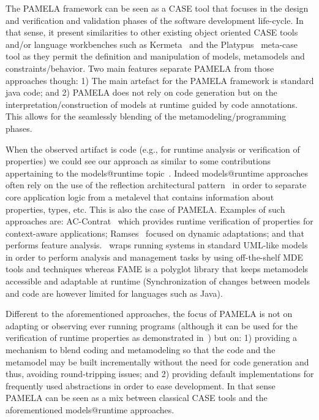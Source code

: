 The PAMELA framework can be seen as a CASE tool that focuses in the design and verification and validation phases of the software development life-cycle. In that sense, it present similarities to other existing object oriented CASE tools and/or language workbenches such as Kermeta~\cite{kermeta} and the Platypus~\cite{platypus} meta-case tool as they permit the definition and manipulation of models, metamodels and constraints/behavior. Two main features separate PAMELA from those approaches though: 1) The main artefact for the PAMELA framework is standard java code; and 2) PAMELA does not rely on code generation but on the interpretation/construction of models at runtime guided by code annotations. This allows for the seamlessly blending of the metamodeling/programming phases.

When the observed artifact is code (e.g., for runtime analysis or verification of properties) we could see our approach as similar to some contributions appertaining to the models@runtime topic~\cite{bencomo2019models}. Indeed models@runtime approaches often rely  on the use of the reflection architectural pattern~\cite{buschmann2008pattern} in order to separate core application logic from a metalevel that contains information about properties, types, etc. This is also the case of PAMELA. 
Examples of such approaches are: AC-Contrat~\cite{accontract} which provides runtime verification of properties for context-aware applications; Ramses~\cite{ramses} focused on dynamic adaptations; and \cite{denker2010modeling} that performs feature analysis.~\cite{song2010applying} wraps running systems in standard UML-like models in order to perform analysis and management tasks by using off-the-shelf MDE tools and techniques whereas FAME \cite{kuhn2008fame} is a polyglot library that keeps metamodels accessible and adaptable at runtime (Synchronization of changes between models and code are however limited for languages such as Java).

Different to the aforementioned approaches, the focus of PAMELA is not on adapting or observing ever running programs (although it can be used for the verification of runtime properties as demonstrated in~\cite{silva20}) but on: 1) providing a mechanism to blend coding and metamodeling so that the code and the metamodel may be built incrementally without the need for code generation and thus, avoiding round-tripping issues; and 2) providing default implementations for frequently used abstractions in order to ease development. In that sense PAMELA can be seen as a mix between classical CASE tools and the aforementioned models@runtime approaches.

